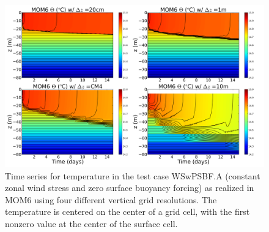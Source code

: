 \begin{figure}[h!t]
\begin{center}
\includegraphics[angle=0,width=14cm]{./figs/MOM6/WSwPSBF_A_MOM6_temp.png}
\caption[Temperature from MOM6 for WSwPSBF.A ]{\sf Time series for
  temperature in the test case WSwPSBF.A (constant zonal wind stress
  and zero surface buoyancy forcing) as realized in MOM6 using four
  different vertical grid resolutions.  The temperature is centered on
  the center of a grid cell, with the first nonzero value at the
  center of the surface cell.}
\label{fig:WSwPSBF_A_MOM6_temp}
\end{center}
\end{figure}

